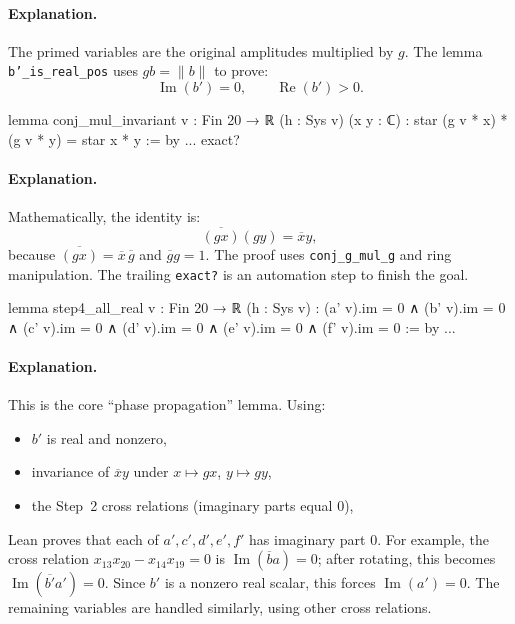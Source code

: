 \documentclass[11pt]{article}
\begin{document}
\paragraph{Explanation.}
The primed variables are the original amplitudes multiplied by $g$.
The lemma \texttt{b'\_is\_real\_pos} uses $gb=\lVert b\rVert$ to prove:
\[
\operatorname{Im}(b')=0,\qquad \operatorname{Re}(b')>0.
\]

\begin{LeanCode}
lemma conj_mul_invariant {v : Fin 20 → ℝ} (h : Sys v) (x y : ℂ) :
  star (g v * x) * (g v * y) = star x * y := by
  ...
  exact?
\end{LeanCode}

\paragraph{Explanation.}
Mathematically, the identity is:
\[
\overline{(g x)}(g y) = \overline{x}y,
\]
because $\overline{(g x)}=\overline{x}\,\overline{g}$ and $\overline{g}g=1$.
The proof uses \texttt{conj\_g\_mul\_g} and ring manipulation.  The trailing \texttt{exact?} is an automation step to finish the goal.

\begin{LeanCode}
lemma step4_all_real {v : Fin 20 → ℝ} (h : Sys v) :
  (a' v).im = 0 ∧ (b' v).im = 0 ∧ (c' v).im = 0 ∧ (d' v).im = 0 ∧ (e' v).im = 0 ∧ (f' v).im = 0 := by
  ...
\end{LeanCode}

\paragraph{Explanation.}
This is the core ``phase propagation'' lemma.
Using:
\begin{itemize}
\item $b'$ is real and nonzero,
\item invariance of $\overline{x}y$ under $x\mapsto gx$, $y\mapsto gy$,
\item the Step~2 cross relations (imaginary parts equal $0$),
\end{itemize}
Lean proves that each of $a',c',d',e',f'$ has imaginary part $0$.
For example, the cross relation $x_{13}x_{20}-x_{14}x_{19}=0$ is $\operatorname{Im}(\overline{b}a)=0$; after rotating, this becomes $\operatorname{Im}(\overline{b'}a')=0$.
Since $b'$ is a nonzero real scalar, this forces $\operatorname{Im}(a')=0$.
The remaining variables are handled similarly, using other cross relations.
\end{document}
